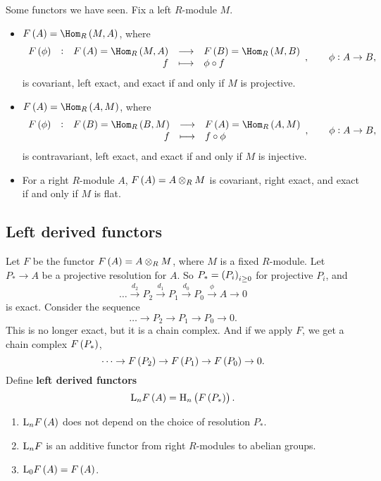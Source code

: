 \begin{example*}
Some functors we have seen. Fix a left $ R $-module $ M $.
\begin{itemize}
\item $ F\br{A} = \Hom_R\br{M, A} $, where
$$ \function[F\br{\phi}]{F\br{A} = \Hom_R\br{M, A}}{F\br{B} = \Hom_R\br{M, B}}{f}{\phi \circ f}, \qquad \phi : A \to B, $$
is covariant, left exact, and exact if and only if $ M $ is projective.
\item $ F\br{A} = \Hom_R\br{A, M} $, where
$$ \function[F\br{\phi}]{F\br{B} = \Hom_R\br{B, M}}{F\br{A} = \Hom_R\br{A, M}}{f}{f \circ \phi}, \qquad \phi : A \to B, $$
is contravariant, left exact, and exact if and only if $ M $ is injective.
\item For a right $ R $-module $ A $, $ F\br{A} = A \otimes_R M $ is covariant, right exact, and exact if and only if $ M $ is flat.
\end{itemize}
\end{example*}

\pagebreak

\subsection{Left derived functors}

Let $ F $ be the functor $ F\br{A} = A \otimes_R M $, where $ M $ is a fixed $ R $-module. Let $ P_* \to A $ be a projective resolution for $ A $. So $ P_* = \br{P_i}_{i \ge 0} $ for projective $ P_i $, and
$$ \dots \xrightarrow{d_2} P_2 \xrightarrow{d_1} P_1 \xrightarrow{d_0} P_0 \xrightarrow{\phi} A \to 0 $$
is exact. Consider the sequence
$$ \dots \to P_2 \to P_1 \to P_0 \to 0. $$
This is no longer exact, but it is a chain complex. And if we apply $ F $, we get a chain complex $ F\br{P_*} $,
$$ \dots \to F\br{P_2} \to F\br{P_1} \to F\br{P_0} \to 0. $$
Define \textbf{left derived functors}
$$ \L_nF\br{A} = \H_n\br{F\br{P_*}}. $$

\begin{theorem}
\hfill
\begin{enumerate}
\item $ \L_nF\br{A} $ does not depend on the choice of resolution $ P_* $.
\item $ \mathrm{L}_nF $ is an additive functor from right $ R $-modules to abelian groups.
\item $ \L_0F\br{A} = F\br{A} $.
\end{enumerate}
\end{theorem}

